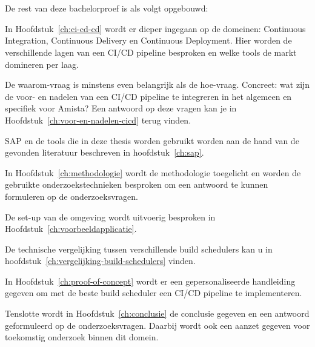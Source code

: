 \section{}
\label{sec:opzet-bachelorproef}


De rest van deze bachelorproef is als volgt opgebouwd:

In Hoofdstuk~\ref{ch:ci-cd-cd} wordt er dieper ingegaan op de domeinen: Continuous Integration, Continuous Delivery en Continuous Deployment. Hier worden de verschillende lagen van een CI/CD pipeline besproken en welke tools de markt domineren per laag.

De waarom-vraag is minstens even belangrijk als de hoe-vraag. Concreet: wat zijn de voor- en nadelen van een CI/CD pipeline te integreren in het algemeen en specifiek voor Amista? Een antwoord op deze vragen kan je in Hoofdstuk~\ref{ch:voor-en-nadelen-cicd} terug vinden.

SAP en de tools die in deze thesis worden gebruikt worden aan de hand van de gevonden literatuur beschreven in hoofdstuk~\ref{ch:sap}.

In Hoofdstuk~\ref{ch:methodologie} wordt de methodologie toegelicht en worden de gebruikte onderzoekstechnieken besproken om een antwoord te kunnen formuleren op de onderzoeksvragen.

De set-up van de omgeving wordt uitvoerig besproken in Hoofdstuk~\ref{ch:voorbeeldapplicatie}.

De technische vergelijking tussen verschillende build schedulers kan u in hoofdstuk~\ref{ch:vergelijking-build-schedulers} vinden.

In Hoofdstuk~\ref{ch:proof-of-concept} wordt er een gepersonaliseerde handleiding gegeven om met de beste build scheduler een CI/CD pipeline te implementeren.

Tenslotte wordt in Hoofdstuk~\ref{ch:conclusie} de conclusie gegeven en een antwoord geformuleerd op de onderzoeksvragen. Daarbij wordt ook een aanzet gegeven voor toekomstig onderzoek binnen dit domein.